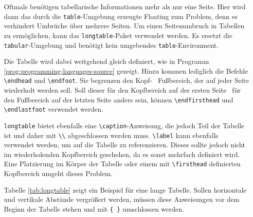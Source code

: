 Oftmals benötigen tabellarische Informationen mehr als nur eine Seite. Hier
wird dann das durch die \texttt{table}-Umgebung erzeugte Floating zum
Problem, denn es verhindert Umbrüche über mehrere Seiten. Um einen
Seitenumbruch in Tabellen zu ermöglichen, kann das \texttt{longtable}-Paket
verwendet werden. Es ersetzt die \texttt{tabular}-Umgebung und benötigt kein
umgebendes \texttt{table}-Environment.

Die Tabelle wird dabei weitgehend gleich definiert, wie in Programm
\ref{prog:programming-languages-source} gezeigt. Hinzu kommen lediglich die
Befehle \verb|\endhead| und \verb|\endfoot|. Sie begrenzen den Kopf- \bzw\
Fußbereich, der auf jeder Seite wiederholt werden soll. Soll dieser für den
Kopfbereich auf der ersten Seite \bzw\ für den Fußbereich auf der letzten
Seite anders sein, können \verb|\endfirsthead| und \verb|\endlastfoot|
verwendet werden.

\texttt{longtable} bietet ebenfalls eine \verb|\caption|-Anweisung, die
jedoch Teil der Tabelle ist und daher mit \verb|\\| abgeschlossen werden muss.
\verb|\label| kann ebenfalls verwendet werden, um auf die Tabelle zu
referenzieren. Dieses sollte jedoch nicht im wiederholenden Kopfbereich
geschehen, da es sonst mehrfach definiert wird. Eine Platzierung im Körper
der Tabelle oder einem mit \verb|\firsthead| definierten Kopfbereich umgeht
dieses Problem.

Tabelle \ref{tab:longtable} zeigt ein Beispiel für eine lange Tabelle. Sollen
horizontale und vertikale Abstände vergrößert werden, müssen diese
Anweisungen vor dem Beginn der Tabelle stehen und mit \verb|{ }| umschlossen
werden.

